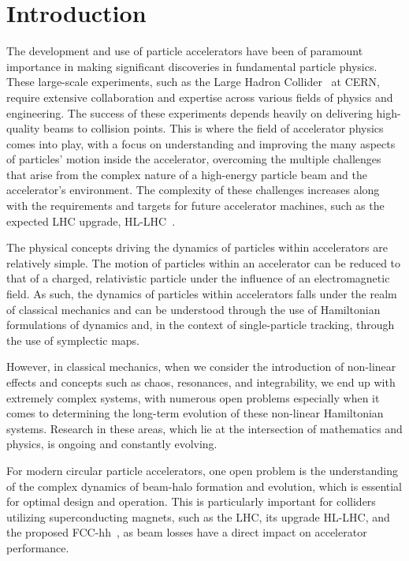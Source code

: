 


\chapter*{Introduction}

The development and use of particle accelerators have been of paramount importance in making significant discoveries in fundamental particle physics. These large-scale experiments, such as the Large Hadron Collider~\cite{Benedikt:823808} at CERN, require extensive collaboration and expertise across various fields of physics and engineering. The success of these experiments depends heavily on delivering high-quality beams to collision points. This is where the field of accelerator physics comes into play, with a focus on understanding and improving the many aspects of particles' motion inside the accelerator, overcoming the multiple challenges that arise from the complex nature of a high-energy particle beam and the accelerator's environment. The complexity of these challenges increases along with the requirements and targets for future accelerator machines, such as the expected LHC upgrade, HL-LHC~\cite{BejarAlonso:2749422, Arduini_2016}.

The physical concepts driving the dynamics of particles within accelerators are relatively simple. The motion of particles within an accelerator can be reduced to that of a charged, relativistic particle under the influence of an electromagnetic field. As such, the dynamics of particles within accelerators falls under the realm of classical mechanics and can be understood through the use of Hamiltonian formulations of dynamics and, in the context of single-particle tracking, through the use of symplectic maps.

However, in classical mechanics, when we consider the introduction of non-linear effects and concepts such as chaos, resonances, and integrability, we end up with extremely complex systems, with numerous open problems especially when it comes to determining the long-term evolution of these non-linear Hamiltonian systems. Research in these areas, which lie at the intersection of mathematics and physics, is ongoing and constantly evolving.

For modern circular particle accelerators, one open problem is the understanding of the complex dynamics of beam-halo formation and evolution, which is essential for optimal design and operation. This is particularly important for colliders utilizing superconducting magnets, such as the LHC, its upgrade HL-LHC, and the proposed FCC-hh~\cite{Benedikt:2651300}, as beam losses have a direct impact on accelerator performance.


